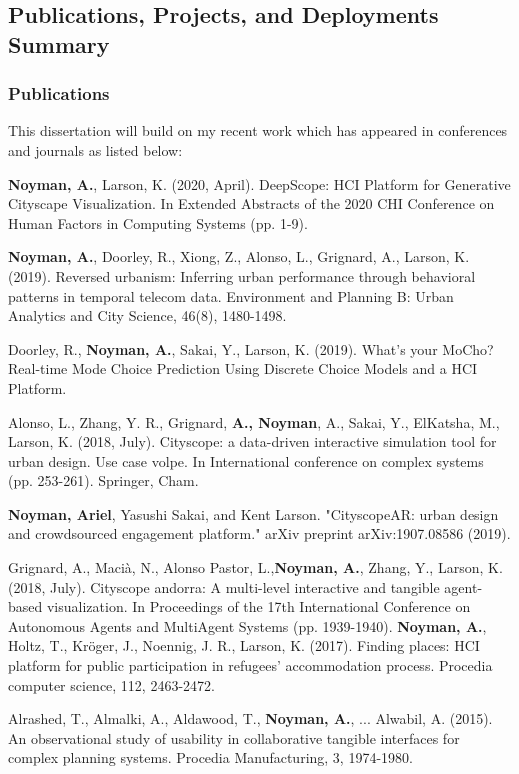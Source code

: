 \newpage
\subsection{Publications, Projects, and Deployments Summary}
\subsubsection{Publications}

This dissertation will build on my recent work which has appeared in conferences and journals as listed below:

{\textbf{Noyman, A.}, Larson, K. (2020, April). DeepScope: HCI Platform for Generative Cityscape Visualization. In Extended Abstracts of the 2020 CHI Conference on Human Factors in Computing Systems (pp. 1-9).}

{\textbf{Noyman, A.}, Doorley, R., Xiong, Z., Alonso, L., Grignard, A., Larson, K. (2019). Reversed urbanism: Inferring urban performance through behavioral patterns in temporal telecom data. Environment and Planning B: Urban Analytics and City Science, 46(8), 1480-1498.}

{Doorley, R., \textbf{Noyman, A.}, Sakai, Y., Larson, K. (2019). What’s your MoCho? Real-time Mode Choice Prediction Using Discrete Choice Models and a HCI Platform.}

{Alonso, L., Zhang, Y. R., Grignard, \textbf{A., Noyman}, A., Sakai, Y., ElKatsha, M., Larson, K. (2018, July). Cityscope: a data-driven interactive simulation tool for urban design. Use case volpe. In International conference on complex systems (pp. 253-261). Springer, Cham.}

{\textbf{Noyman, Ariel}, Yasushi Sakai, and Kent Larson. "Cityscope{AR}: urban design and crowdsourced engagement platform." arXiv preprint arXiv:1907.08586 (2019).}

{Grignard, A., Macià, N., Alonso Pastor, L.,\textbf{Noyman, A.}, Zhang, Y., Larson, K. (2018, July). Cityscope andorra: A multi-level interactive and tangible agent-based visualization. In Proceedings of the 17th International Conference on Autonomous Agents and MultiAgent Systems (pp. 1939-1940).
}
{\textbf{Noyman, A.}, Holtz, T., Kröger, J., Noennig, J. R., Larson, K. (2017). Finding places: HCI platform for public participation in refugees’ accommodation process. Procedia computer science, 112, 2463-2472.}

{Alrashed, T., Almalki, A., Aldawood, T., \textbf{Noyman, A.}, ... Alwabil, A. (2015). An observational study of usability in collaborative tangible interfaces for complex planning systems. Procedia Manufacturing, 3, 1974-1980.}

